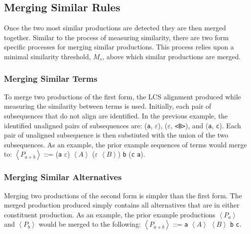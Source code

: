 \documentclass[conference]{IEEEtran}
\begin{document}
\hypertarget{sec:merging_similar}{%
\subsection{Merging Similar Rules}\label{sec:merging_similar}}

Once the two most similar productions are detected they are then merged
together. Similar to the process of measuring similarity, there are two
form specific processes for merging similar productions. This process
relies upon a minimal similarity threshold, \(M_s\), above which similar
productions are merged.

\hypertarget{merging-similar-terms}{%
\subsubsection{Merging Similar Terms}\label{merging-similar-terms}}

To merge two productions of the first form, the LCS alignment produced
while measuring the similarity between terms is used. Initially, each
pair of subsequences that do not align are identified. In the previous
example, the identified unaligned pairs of subsequences are:
(\texttt{\textquotesingle{}a\textquotesingle{}}, \(\varepsilon\)),
(\(\varepsilon\), \texttt{\textless{}B\textgreater{}}), and
(\texttt{\textquotesingle{}a\textquotesingle{}},
\texttt{\textquotesingle{}c\textquotesingle{}}). Each pair of unaligned
subsequence is then substiuted with the union of the two subsequences.
As an example, the prior example sequences of terms would merge to:
\(\left<P_{a+b}\right>\) ::=
(\texttt{\textquotesingle{}a\textquotesingle{}} \textbar{}
\(\varepsilon\)) \(\left<A\right>\) (\(\varepsilon\) \textbar{}
\(\left<B\right>\)) \texttt{\textquotesingle{}b\textquotesingle{}}
(\texttt{\textquotesingle{}c\textquotesingle{}} \textbar{}
\texttt{\textquotesingle{}a\textquotesingle{}}).

\hypertarget{merging-similar-alternatives}{%
\subsubsection{Merging Similar
Alternatives}\label{merging-similar-alternatives}}

Merging two productions of the second form is simpler than the first
form. The merged production produced simply contains all alternatives
that are in either constituent production. As an example, the prior
example productions \(\left<P_a\right>\) and \(\left<P_b\right>\) would
be merged to the following: \(\left<P_{a+b}\right>\) ::=
\texttt{\textquotesingle{}a\textquotesingle{}} \textbar{}
\(\left<A\right>\) \textbar{} \(\left<B\right>\) \textbar{}
\texttt{\textquotesingle{}b\textquotesingle{}} \textbar{}
\texttt{\textquotesingle{}c\textquotesingle{}}.
\end{document}
